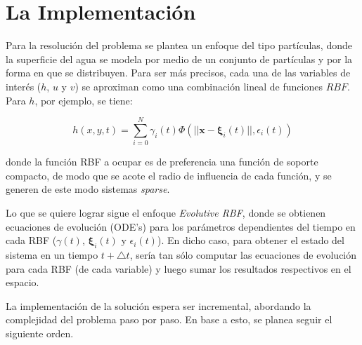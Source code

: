 \documentclass[spanish, fleqn]{article}
\begin{document}
\section{La Implementación}
Para la resolución del problema se plantea un enfoque del tipo partículas, donde la superficie del agua se modela por medio 
de un conjunto de partículas y por la forma en que se distribuyen. Para ser más precisos, cada una de las variables de interés 
($h$, $u$ y $v$) se aproximan como una combinación lineal de funciones $RBF$. Para $h$, por ejemplo, se tiene:

$$h(x,y,t) = \sum_{i=0}^{N} \gamma_i(t)\Phi(||\mathbf{x}-\boldsymbol{\xi}_i(t)||, \epsilon_i(t))$$
 
donde la función RBF a ocupar es de preferencia una función de soporte compacto, de modo que se acote el radio de influencia 
de cada función, y se generen de este modo sistemas \textit{sparse}.

Lo que se quiere lograr sigue el enfoque \textit{Evolutive RBF}, donde se obtienen ecuaciones de evolución (ODE's) para los 
parámetros dependientes del tiempo en cada RBF ($\gamma(t)$, $\boldsymbol{\xi}_i(t)$ y $\epsilon_i(t)$). En dicho caso, para 
obtener el estado del sistema en un tiempo $t+\triangle t$, sería tan sólo computar las ecuaciones de evolución para cada RBF 
(de cada variable) y luego sumar los resultados respectivos en el espacio.

La implementación de la solución espera ser incremental, abordando la complejidad del problema paso por paso. En base a esto, se planea seguir el siguiente orden.
\end{document}
